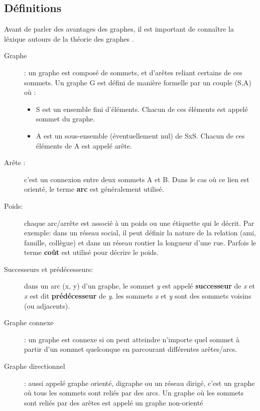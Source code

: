 \subsection{Définitions}
Avant de parler des avantages des graphes, il est important de connaître la léxique autours de la théorie des graphes \cite{WikiGraphes}.
\begin{description}
\item[Graphe]: un graphe est composé de sommets, et d'arêtes reliant certains de ces sommets.
Un graphe G est défini de manière formelle par un couple (S,A) où :
\begin{itemize}
	\item S est un ensemble fini d'éléments. Chacun de ces éléments est appelé sommet du graphe.
	\item A est un sous-ensemble (éventuellement nul) de SxS. Chacun de ces éléments de A est appelé arête.
\end{itemize}
\item[Arête :] c'est un connexion entre deux sommets A et B. Dans le cas où ce lien est orienté, le terme \textbf{arc} est généralement utilisé.

\item[Poids:] chaque arc/arrête est associé à un poids ou une étiquette qui le décrit. Par exemple: dans un réseau social, il peut définir la nature de la relation (ami, famille, collègue) et dans un réseau routier la longueur d'une rue. Parfois le terme \textbf{coût} est utilisé pour décrire le poids.

\item[Successeurs et prédécesseurs:] dans un arc (x, y) d'un graphe, le sommet \emph{y} est appelé \textbf{successeur} de \emph{x} et \emph{x} est dit \textbf{prédécesseur} de \emph{y}.\newline
les sommets \emph{x} et \emph{y} sont des sommets voisins (ou adjacents).

\item[Graphe connexe] : un graphe est connexe si on peut atteindre n'importe quel sommet à partir d'un sommet quelconque en parcourant différentes arêtes/arcs.

\item[Graphe directionnel] : aussi appelé graphe orienté, digraphe ou un réseau dirigé, c'est un graphe où tous les sommets sont reliés par des arcs.
Un graphe où les sommets sont reliés par des arêtes est appelé un graphe non-orienté


\end{description}
